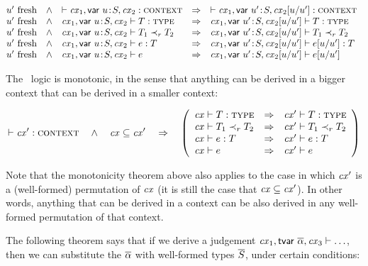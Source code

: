 \begin{theorem}\label{thm-deriv-rename-var}
\[
\begin{array}{@{\fresh{\varI'}\ \ \AND\ \ }l@{\ \ \IMPLIES\ \ }l}
\cxwf{\cxv} &
 \cxwf{\cxvI} \\
\isty{\cxv}{\typ} &
 \isty{\cxvI}{\typ} \\
\issub{\cxv}{\typ_1}{\tspred}{\typ_2} &
 \issub{\cxvI}{\typ_1}{\tspred}{\typ_2} \\
\hasty{\cxv}{\expr}{\typ} &
 \hasty{\cxvI}{\esbsren{\expr}}{\typ} \\
\theo{\cxv}{\expr} &
 \theo{\cxvI}{\esbsren{\expr}}
\end{array}
\]
\end{theorem}

The \MS\ logic is monotonic, in the sense that anything can be derived in a
bigger context that can be derived in a smaller context:

\begin{theorem}\label{thm-mono}
\[
\cxwf{\cx'}\ \ \AND\ \ \cx\subseteq\cx'\ \ \IMPLIES\ \
\left(
\begin{array}{l@{\ \ \IMPLIES\ \ }l}
\istyO{\typ}                     & \isty{\cx'}{\typ}                     \\
\issubO{\typ_1}{\tspred}{\typ_2} & \issub{\cx'}{\typ_1}{\tspred}{\typ_2} \\
\hastyO{\expr}{\typ}             & \hasty{\cx'}{\expr}{\typ}             \\
\theoO{\expr}                    & \theo{\cx'}{\expr}
\end{array}
\right)
\]
\end{theorem}

Note that the monotonicity theorem above also applies to the case in which
$\mathit{cx}'$ is a (well-formed) permutation of $\mathit{cx}$ (it is still the case that
$\mathit{cx}\subseteq\mathit{cx}'$). In other words, anything that can be derived in a context
can be also derived in any well-formed permutation of that context.

The following theorem says that if we derive a judgement
$\mathit{cx}_1,\mathsf{tvar}\ \overline{\alpha},\mathit{cx}_3\vdash\ldots$, then we can substitute the $\overline{\alpha}$
with well-formed types $\overline{S}$, under certain conditions:

